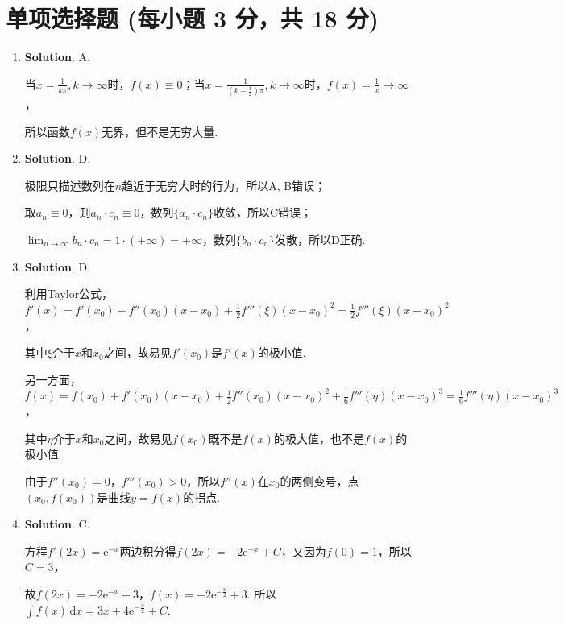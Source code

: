 \documentclass[../Main.tex]{subfiles}
\begin{document}
\section{单项选择题 (每小题 3 分，共 18 分)}
\begin{enumerate}
    \item \textbf{Solution}. A.

          当$x=\frac{1}{k\pi},k\to\infty$时，$f(x)\equiv0$；当$x=\frac{1}{(k+\frac{1}{2})\pi}
              ,k\to\infty$时，$f(x)=\frac{1}{x}\to\infty$，

          所以函数$f(x)$无界，但不是无穷大量.

    \item \textbf{Solution}. D.

          极限只描述数列在$n$趋近于无穷大时的行为，所以A, B错误；

          取$a_{n}\equiv0$，则$a_{n}\cdot c_{n}\equiv0$，数列$\{a_{n}\cdot c_{n}\}$收敛，所以C错误；

          $\lim_{n\to\infty}b_{n}\cdot c_{n}=1\cdot(+\infty)=+\infty$，数列$\{b_{n}\cdot
              c_{n}\}$发散，所以D正确.

    \item \textbf{Solution}. D.

          利用Taylor公式，$f'(x)=f'(x_{0})+f''(x_{0})(x-x_{0})+\frac{1}{2}f'''(\xi)(x
              -x_{0})^{2}=\frac{1}{2}f'''(\xi)(x-x_{0})^{2}$，

          其中$\xi$介于$x$和$x_{0}$之间，故易见$f'(x_{0})$是$f'(x)$的极小值.

          另一方面，$f(x)=f(x_{0})+f'(x_{0})(x-x_{0})+\frac{1}{2}f''(x_{0})(x-x_{0})^{2}
              +\frac{1}{6}f'''(\eta)(x-x_{0})^{3}=\frac{1}{6}f'''(\eta)(x-x_{0})^{3}$，

          其中$\eta$介于$x$和$x_{0}$之间，故易见$f(x_{0})$既不是$f(x)$的极大值，也不是$f
              (x)$的极小值.

          由于$f''(x_{0})=0$，$f'''(x_{0})>0$，所以$f''(x)$在$x_{0}$的两侧变号，点$(x
                  _{0},f(x_{0}))$是曲线$y=f(x)$的拐点.

    \item \textbf{Solution}. C.

          方程$f'(2x)=\mathrm{e}^{-x}$两边积分得$f(2x)=-2\mathrm{e}^{-x}+C$，又因为$f
              (0)=1$，所以$C=3$，

          故$f(2x)=-2\mathrm{e}^{-x}+3$，$f(x)=-2\mathrm{e}^{-\frac{x}{2}}+3$. 所以$\int
              f(x)\,\mathrm{d}x=3x+4\mathrm{e}^{-\frac{x}{2}}+C$.


\end{enumerate}
\end{document}
